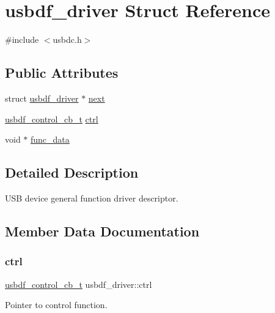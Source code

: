 \hypertarget{structusbdf__driver}{}\section{usbdf\+\_\+driver Struct Reference}
\label{structusbdf__driver}


{\ttfamily \#include $<$usbdc.\+h$>$}

\subsection*{Public Attributes}
\begin{DoxyCompactItemize}
\item 
struct \hyperlink{structusbdf__driver}{usbdf\+\_\+driver} $\ast$ \hyperlink{structusbdf__driver_ad6c0a752bcfec6493f48bfcb9bdd0537}{next}
\item 
\hyperlink{usbdc_8h_a3a49c87f251ce87f1e502fa5ef2f1831}{usbdf\+\_\+control\+\_\+cb\+\_\+t} \hyperlink{structusbdf__driver_a7dd9a1710b02f4e1d44b2826c9c7f43c}{ctrl}
\item 
void $\ast$ \hyperlink{structusbdf__driver_a2c4f8d76c15e18fc25f4aea018e712b4}{func\+\_\+data}
\end{DoxyCompactItemize}


\subsection{Detailed Description}
U\+SB device general function driver descriptor. 

\subsection{Member Data Documentation}
\mbox{\label{structusbdf__driver_a7dd9a1710b02f4e1d44b2826c9c7f43c}} 
\subsubsection{\texorpdfstring{ctrl}{ctrl}}
{\footnotesize\ttfamily \hyperlink{usbdc_8h_a3a49c87f251ce87f1e502fa5ef2f1831}{usbdf\+\_\+control\+\_\+cb\+\_\+t} usbdf\+\_\+driver\+::ctrl}

Pointer to control function. \mbox{\label{structusbdf__driver_a2c4f8d76c15e18fc25f4aea018e712b4}} 
